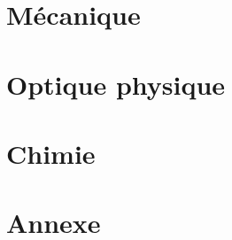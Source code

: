 \documentclass[a4paper, titlepage,twoside]{book}
\begin{document}
\part{Mécanique}
\setcounter{chapter}{0}

\part{Optique physique}
\setcounter{chapter}{0}





\part{Chimie}
\setcounter{chapter}{0}



\appendix
\part{Annexe}

\backmatter
\tableofcontents            %
\end{document}
